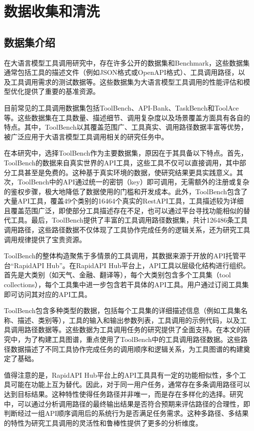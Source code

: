 \section{数据收集和清洗}

\subsection{数据集介绍}

在大语言模型工具调用研究中，存在许多公开的数据集和Benchmark，这些数据集通常包括工具的描述文件（例如JSON格式或OpenAPI格式）、工具调用路径，以及工具调用需求的测试数据等。这些数据集为大语言模型工具调用的性能评估和模型优化提供了重要的基准资源。

目前常见的工具调用数据集包括ToolBench\cite{Qin2023}、API-Bank\cite{Li2023c}、TaskBench\cite{shen2023taskbench}和ToolAce\cite{liu2024toolace}等。这些数据集在工具数量、描述细节、调用复杂度以及场景覆盖方面具有各自的特点。其中，ToolBench以其覆盖范围广、工具真实、调用路径数据丰富等优势，被广泛应用于大语言模型工具调用相关的研究任务中。

在本研究中，选择ToolBench作为主要数据集，原因在于其具备以下特点。首先，ToolBench的数据来自真实世界的API工具，这些工具不仅可以直接调用，其中部分工具甚至是免费的。这种基于真实环境的数据，使研究结果更具实践意义。其次，ToolBench中的API通过统一的密钥（key）即可调用，无需额外的注册或复杂的鉴权步骤，极大地降低了数据使用的门槛和开发成本。此外，ToolBench包含了大量API工具，覆盖49个类别的16464个真实的RestAPI工具，工具描述较为详细且覆盖范围广泛，即使部分工具描述存在不足，也可以通过平台寻找功能相似的替代工具。最后，ToolBench提供了丰富的工具调用路径数据集，共计126486条工具调用路径，这些路径数据不仅体现了工具协作完成任务的逻辑关系，还为研究工具调用规律提供了宝贵资源。

ToolBench的整体构造聚焦于多情景的工具调用，其数据来源于开放的API托管平台“RapidAPI Hub”。在RapidAPI Hub平台上，API工具以层级化结构进行组织。首先是大类别（如天气、金融、翻译等），每个大类别包含多个工具集（tool collections），每个工具集中进一步包含若干具体的API工具。用户通过订阅工具集即可访问其对应的API工具。

ToolBench包含多种类型的数据，包括每个工具集的详细描述信息（例如工具集名称、描述、类别等），工具的输入和输出参数列表，工具调用的示例代码，以及工具调用路径数据等。这些数据为工具调用任务的研究提供了全面支持。在本文的研究中，为了构建工具图谱，重点使用了ToolBench中的工具调用路径数据。这些路径数据描述了不同工具协作完成任务的调用顺序和逻辑关系，为工具图谱的构建奠定了基础。

值得注意的是，RapidAPI Hub平台上的API工具具有一定的功能相似性，多个工具可能在功能上互为替代。因此，对于同一用户任务，通常存在多条调用路径可以达到目标结果。这种特性使得任务路径并非唯一，而是存在多样化的选择。研究中，可以通过分析调用路径的最终输出结果是否符合预期来评估路径的合理性，即判断经过一组API顺序调用后的系统行为是否满足任务需求。这种多路径、多结果的特性为研究工具调用的灵活性和鲁棒性提供了更多的分析维度。

